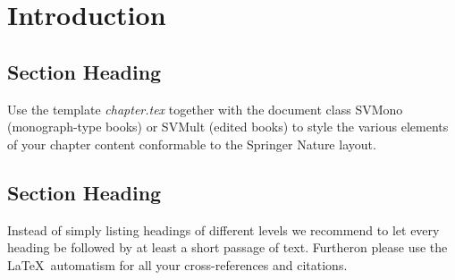 %
%
%
\chapter{Introduction}
\label{intro} %



\section{Section Heading}
\label{sec:1}
Use the template \emph{chapter.tex} together with the document class SVMono (monograph-type books) or SVMult (edited books) to style the various elements of your chapter content conformable to the Springer Nature layout.

\section{Section Heading}
\label{sec:2}
Instead of simply listing headings of different levels we recommend to let every heading be followed by at least a short passage of text. Furtheron please use the \LaTeX\ automatism for all your cross-references and citations.


